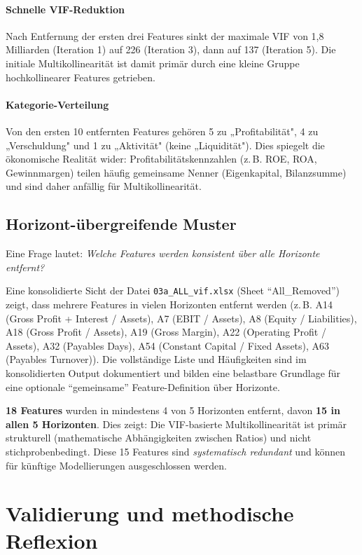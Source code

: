\paragraph{Schnelle VIF-Reduktion} Nach Entfernung der ersten drei Features sinkt der maximale VIF von 1,8 Milliarden (Iteration 1) auf 226 (Iteration 3), dann auf 137 (Iteration 5). Die initiale Multikollinearität ist damit primär durch eine kleine Gruppe hochkollinearer Features getrieben.

\paragraph{Kategorie-Verteilung} Von den ersten 10 entfernten Features gehören 5 zu „Profitabilität", 4 zu „Verschuldung" und 1 zu „Aktivität" (keine „Liquidität"). Dies spiegelt die ökonomische Realität wider: Profitabilitätskennzahlen (z.\,B. ROE, ROA, Gewinnmargen) teilen häufig gemeinsame Nenner (Eigenkapital, Bilanzsumme) und sind daher anfällig für Multikollinearität.

\subsection{Horizont-übergreifende Muster}

Eine Frage lautet: \textit{Welche Features werden konsistent über alle Horizonte entfernt?}

\noindent Eine konsolidierte Sicht der Datei \texttt{03a\_ALL\_vif.xlsx} (Sheet \enquote{All\_Removed}) zeigt, dass mehrere Features in vielen Horizonten entfernt werden (z.\,B. A14 (Gross Profit + Interest / Assets), A7 (EBIT / Assets), A8 (Equity / Liabilities), A18 (Gross Profit / Assets), A19 (Gross Margin), A22 (Operating Profit / Assets), A32 (Payables Days), A54 (Constant Capital / Fixed Assets), A63 (Payables Turnover)). Die vollständige Liste und Häufigkeiten sind im konsolidierten Output dokumentiert und bilden eine belastbare Grundlage für eine optionale \enquote{gemeinsame} Feature-Definition über Horizonte.

\textbf{18 Features} wurden in mindestens 4 von 5 Horizonten entfernt, davon \textbf{15 in allen 5 Horizonten}. Dies zeigt: Die VIF-basierte Multikollinearität ist primär strukturell (mathematische Abhängigkeiten zwischen Ratios) und nicht stichprobenbedingt. Diese 15 Features sind \textit{systematisch redundant} und können für künftige Modellierungen ausgeschlossen werden.

\section{Validierung und methodische Reflexion}

